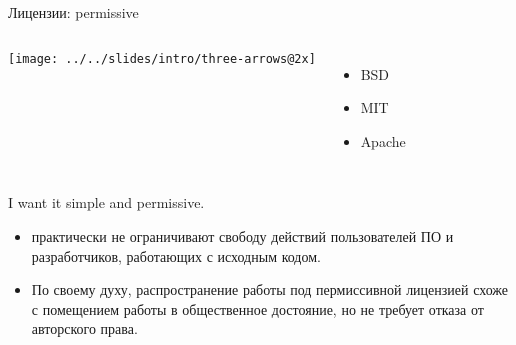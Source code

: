 \begin{frame}{Лицензии: permissive}
	\begin{columns}
		\center\texttt{[image: ../../slides/intro/three-arrows@2x]}


	\begin{itemize}
		\item BSD
		\item MIT
		\item Apache
	\end{itemize}
	\end{columns}

	\begin{block}{I want it simple and permissive.}
		\begin{itemize}
			\item практически не ограничивают свободу действий пользователей ПО и разработчиков, работающих с исходным кодом.
			\item По своему духу, распространение работы под пермиссивной лицензией схоже с помещением работы в общественное
				достояние, но не требует отказа от авторского права.
		\end{itemize}
	\end{block}

\end{frame}


